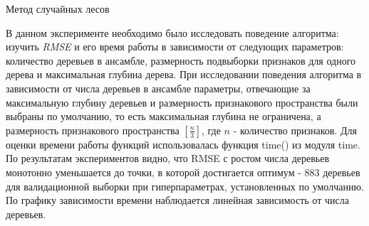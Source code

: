 \documentclass[12pt]{article}
\begin{document}
\begin{section}{Метод случайных лесов}

В данном эксперименте необходимо было исследовать поведение алгоритма: изучить \emph{RMSE} и его время работы в зависимости от следующих параметров: количество деревьев в ансамбле, размерность подвыборки признаков для одного дерева и максимальная глубина дерева. При исследовании поведения алгоритма в зависимости от числа деревьев в ансамбле параметры, отвечающие за максимальную глубину деревьев и размерность признакового пространства были выбраны по умолчанию, то есть максимальная глубина не ограничена, а размерность признакового пространства $[\frac{n}{3}]$, где $n$ - количество признаков. Для оценки времени работы функций использовалась функция time() из модуля time. 
По результатам экспериментов видно, что RMSE с ростом числа деревьев монотонно уменьшается до точки, в которой достигается оптимум - 883 деревьев для валидационной выборки при гиперпараметрах, установленных по умолчанию. По графику зависимости времени наблюдается линейная зависимость от числа деревьев.



\end{section}
\end{document}
